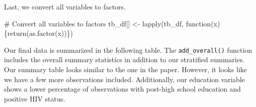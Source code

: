 \documentclass[
  letterpaper,
]{latex/krantz}
\makeatletter
\newenvironment{Shaded}{\begin{snugshade}}{\end{snugshade}}
\newcommand{\CommentTok}[1]{\textcolor[rgb]{0.37,0.37,0.37}{#1}}
\newcommand{\ConstantTok}[1]{\textcolor[rgb]{0.56,0.35,0.01}{#1}}
\newcommand{\ControlFlowTok}[1]{\textcolor[rgb]{0.00,0.23,0.31}{#1}}
\newcommand{\DecValTok}[1]{\textcolor[rgb]{0.68,0.00,0.00}{#1}}
\newcommand{\FunctionTok}[1]{\textcolor[rgb]{0.28,0.35,0.67}{#1}}
\newcommand{\NormalTok}[1]{\textcolor[rgb]{0.00,0.23,0.31}{#1}}
\newcommand{\OtherTok}[1]{\textcolor[rgb]{0.00,0.23,0.31}{#1}}
\newcommand{\SpecialCharTok}[1]{\textcolor[rgb]{0.37,0.37,0.37}{#1}}
\newenvironment{kframe}{%
\medskip{}
\setlength{\fboxsep}{.8em}
 \def\at@end@of@kframe{}%
 \ifinner\ifhmode%
  \def\at@end@of@kframe{\end{minipage}}%
  \begin{minipage}{\columnwidth}%
 \fi\fi%
 \def\FrameCommand##1{\hskip\@totalleftmargin \hskip-\fboxsep
 \colorbox{shadecolor}{##1}\hskip-\fboxsep
     \hskip-\linewidth \hskip-\@totalleftmargin \hskip\columnwidth}%
 \MakeFramed {\advance\hsize-\width
   \@totalleftmargin\z@ \linewidth\hsize
   \@setminipage}}%
 {\par\unskip\endMakeFramed%
 \at@end@of@kframe}
\renewenvironment{Shaded}{\begin{kframe}}{\end{kframe}}
\makeatother
\begin{document}
\begin{Shaded}
\end{Shaded}

Last, we convert all variables to factors.

\begin{Shaded}
\begin{Highlighting}[]
\CommentTok{\# Convert all variables to factors }
\NormalTok{tb\_df[] }\OtherTok{\textless{}{-}} \FunctionTok{lapply}\NormalTok{(tb\_df, }\ControlFlowTok{function}\NormalTok{(x)\{}\FunctionTok{return}\NormalTok{(}\FunctionTok{as.factor}\NormalTok{(x))\})}
\end{Highlighting}
\end{Shaded}

Our final data is summarized in the following table. The
\texttt{add\_overall()}
function includes the overall summary statistics in addition to our
stratified summaries. Our summary table looks similar to the one in the
paper. However, it looks like we have a few more observations included.
Additionally, our education variable shows a lower percentage of
observations with post-high school education and positive HIV status.
\end{document}
